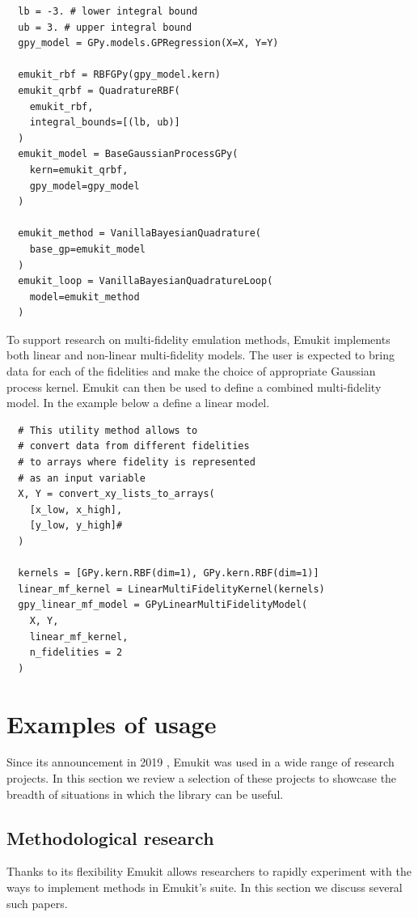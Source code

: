 \begin{verbatim}
  lb = -3. # lower integral bound
  ub = 3. # upper integral bound
  gpy_model = GPy.models.GPRegression(X=X, Y=Y)

  emukit_rbf = RBFGPy(gpy_model.kern)
  emukit_qrbf = QuadratureRBF(
    emukit_rbf,
    integral_bounds=[(lb, ub)]
  )
  emukit_model = BaseGaussianProcessGPy(
    kern=emukit_qrbf,
    gpy_model=gpy_model
  )

  emukit_method = VanillaBayesianQuadrature(
    base_gp=emukit_model
  )
  emukit_loop = VanillaBayesianQuadratureLoop(
    model=emukit_method
  )
\end{verbatim}

To support research on multi-fidelity emulation methods, Emukit implements both linear and non-linear multi-fidelity models. The user is expected to bring data for each of the fidelities and make the choice of appropriate Gaussian process kernel. Emukit can then be used to define a combined multi-fidelity model. In the example below a define a linear model.

\begin{verbatim}
  # This utility method allows to
  # convert data from different fidelities
  # to arrays where fidelity is represented
  # as an input variable
  X, Y = convert_xy_lists_to_arrays(
    [x_low, x_high],
    [y_low, y_high]#
  )

  kernels = [GPy.kern.RBF(dim=1), GPy.kern.RBF(dim=1)]
  linear_mf_kernel = LinearMultiFidelityKernel(kernels)
  gpy_linear_mf_model = GPyLinearMultiFidelityModel(
    X, Y,
    linear_mf_kernel,
    n_fidelities = 2
  )
\end{verbatim}


\section{Examples of usage}
Since its announcement in 2019 \cite{paleyes2019emulation}, Emukit was used in a wide range of research projects. In this section we review a selection of these projects to showcase the breadth of situations in which the library can be useful.

\subsection{Methodological research}
Thanks to its flexibility Emukit allows researchers to rapidly experiment with the ways to implement methods in Emukit's suite. In this section we discuss several such papers.

